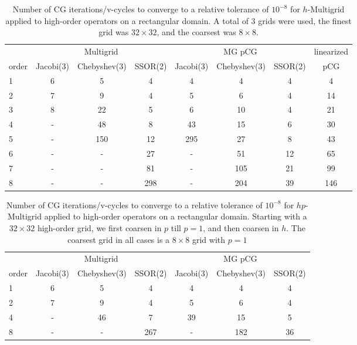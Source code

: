 \begin{table}
  \caption{\label{tab:homg} Number of CG iterations/v-cycles to converge to a relative tolerance of $10^{-8}$ for $h$-Multigrid applied to high-order operators on a rectangular domain. A total of 3 grids were used, the finest grid was $32\times 32$, and the coarsest was $8\times 8$.}
		\centering
    \begin{tabular}{|l|c|c|c|c|c|c|c|} 
	    \hline
				    & \multicolumn{3}{c|}{Multigrid} & \multicolumn{3}{c|}{MG pCG} & linearized \\  \cline{2-7}
			order & \scriptsize Jacobi(3)  &\scriptsize  Chebyshev(3)  &\scriptsize SSOR(2) &\scriptsize Jacobi(3)  &\scriptsize  Chebyshev(3)  &\scriptsize SSOR(2) & pCG\\
			\hline
				1 & 6 &  5 & 4  &  4  & 4  & 4  &  4  \\ 
	    	2 & 7 &  9 & 4  &  5  & 6  & 4  & 14  \\
				3 & 8 & 22 & 5  &  6  & 10 & 4  & 21  \\
				4 & - & 48 & 8  & 43  & 15 & 6  & 30  \\
				5 & - & 150 & 12 & 295 & 27 & 8 & 43  \\
				6 & - & - & 27  & - & 51 & 12   & 65  \\
				7 & - & - & 81 & - & 105 & 21   & 99  \\
				8 & - & - & 298 & - & 204 & 39  & 146 \\
			\hline
	  \end{tabular}
\end{table}

\begin{table}
  \caption{\label{tab:hpmg} Number of CG iterations/v-cycles to converge to a relative tolerance of $10^{-8}$ for $hp$-Multigrid applied to high-order operators on a rectangular domain. Starting with a $32\times 32$ high-order grid, we first coarsen in $p$ till $p=1$, and then coarsen in $h$. The coarsest grid in all cases is a $8\times 8$ grid with $p=1$}
		\centering
		\begin{tabular}{|l|c|c|c|c|c|c|} 
	    \hline
				    & \multicolumn{3}{c|}{Multigrid} & \multicolumn{3}{c|}{MG pCG}\\  \cline{2-7}
			order & \scriptsize Jacobi(3)  &\scriptsize  Chebyshev(3)  &\scriptsize SSOR(2) &\scriptsize Jacobi(3)  &\scriptsize  Chebyshev(3)  &\scriptsize SSOR(2) \\
			\hline
				1 & 6  &  5 &  4 & 4 & 4 & 4 \\ 
	    	2 & 7 & 9  & 4 & 5 & 6 & 4 \\
				4 & - & 46 & 7 & 39 & 15 & 5 \\
				8 & - & - & 267 & - & 182 & 36 \\
			\hline
	  \end{tabular}
\end{table}


